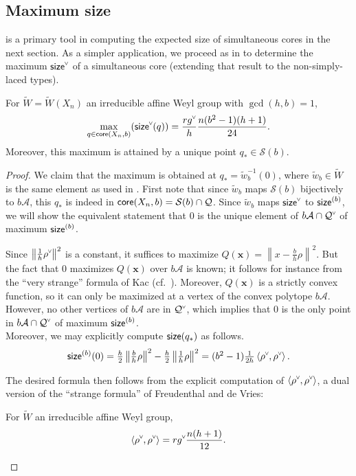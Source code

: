 \documentclass[ALCO,published]{cedram}
\newcommand{\chk}[1]{#1^{\normalfont\smash{\scalebox{.5}[.5]{\rotatebox{90}{\textbf{\textless}}}}}}
\newcommand{\maximum}[2]{\operatorname*{max}\limits_{#1}(#2)}
\newcommand{\wa}{\widetilde{W}}
\newcommand{\Q}{\mathcal{Q}}
\newcommand{\ac}{\mathcal{A}}
\newcommand{\Sommers}{\mathcal{S}}
\newcommand{\core}{{\sf core}}
\newcommand{\waf}{\widetilde{w}}
\newcommand{\wf}{\waf_{\rat}}
\newcommand{\size}{{\sf size}}
\newcommand{\rat}{b}
\begin{document}
\subsection{Maximum size}

 is a primary tool in computing the expected size of simultaneous cores in the next section. As a simpler application, we proceed as in \cite{thiel2017strange} to determine the maximum $\chk{\size}$ of a simultaneous core (extending that result to the non-simply-laced types).

\begin{theorem}
\label{thm:max_size}
For $\wa=\wa(X_n)$ an irreducible affine Weyl group with $\gcd(h,b)=1$, 
\[
\maximum{q \in \core(X_n,b)}{\chk{\size}(q)} = \frac{r\chk{g}}{h}\frac{n(b^2-1)(h+1)}{24}.
\] 
Moreover, this maximum is attained by a unique point $q_* \in \Sommers(b)$.
\end{theorem}

\begin{proof}
We claim that the maximum is obtained at $q_* = \wf^{-1}(0)$, where $\wf\in\wa$ is the same element as used in . First note that since $\wf$ maps $\Sommers(\rat)$ bijectively to $b\ac$, this $q_*$ is indeed in $\core(X_n,\rat)=\Sommers(\rat)\cap\Q$.
Since $\wf$ maps $\chk{\size}$ to $\size^{(b)}$, we will show the equivalent statement that $0$ is the unique element of $\rat\ac\cap\chk\Q$ of maximum $\size^{(b)}$.

Since $\left\|\frac{1}{h}\chk{\rho}\right\|^2$ is a constant, it suffices to maximize $Q(\mathbf{x})=\left\|x-\frac{\rat}{h}\rho\right\|^2$. But the fact that $0$ maximizes $Q(\mathbf{x})$ over $\rat\ac$ is known; it follows for instance from the ``very strange'' formula of Kac (cf.~\cite[Equation (0.9)]{kac84theta}). Moreover, $Q(\mathbf{x})$ is a strictly convex function, so it can only be maximized at a vertex of the convex polytope $\rat\ac$. However, no other vertices of $\rat\ac$ are in $\chk\Q$, which implies that $0$ is the only point in $\rat\ac\cap\chk\Q$ of maximum $\size^{(b)}$.\\

Moreover, we may explicitly compute $\size(q_*)$ as follows.
\[
\textstyle \size^{(b)}(0)
=\frac{h}{2}\left\|\frac{\rat}{h}\rho\right\|^2-\frac{h}{2}\left\|\frac{1}{h}\rho\right\|^2
=(b^2-1)\frac{1}{2h}\left\langle\chk{\rho},\chk{\rho} \right\rangle.
\]

The desired formula then follows from the explicit computation of $\langle \chk{\rho},\chk{\rho}\rangle$, a dual version of the ``strange formula'' of Freudenthal and de Vries:

\begin{theorem}
\label{thm:strange_dual}
For $\wa$ an irreducible affine Weyl group,
\[\langle \chk{\rho},\chk{\rho}\rangle = r\chk{g}\frac{n(h+1)}{12}.\qedhere\]
\end{theorem}
\end{proof}
\end{document}
